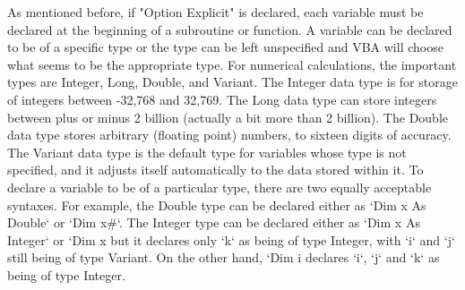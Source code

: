As mentioned before, if "Option Explicit" is declared, each variable
must be declared at the beginning of a subroutine or function. A
variable can be declared to be of a specific type or the type can be
left unspecified and VBA will choose what seems to be the appropriate
type. For numerical calculations, the important types are Integer, Long,
Double, and Variant. The Integer data type is for storage of integers
between -32,768 and 32,769. The Long data type can store integers
between plus or minus 2 billion (actually a bit more than 2 billion).
The Double data type stores arbitrary (floating point) numbers, to
sixteen digits of accuracy. The Variant data type is the default type
for variables whose type is not specified, and it adjusts itself
automatically to the data stored within it. To declare a variable to be
of a particular type, there are two equally acceptable syntaxes. For
example, the Double type can be declared either as `Dim x As Double` or
`Dim x#`. The Integer type can be declared either as `Dim x As Integer`
or `Dim x%
but it declares only `k` as being of type Integer, with `i` and `j`
still being of type Variant. On the other hand, `Dim i%
declares `i`, `j` and `k` as being of type Integer.

